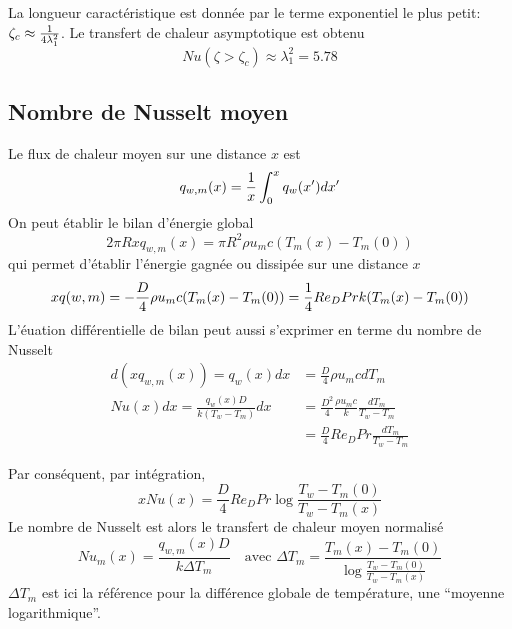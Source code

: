       La longueur caractéristique est donnée par le terme exponentiel le plus petit: $\zeta_c \approx \frac{1}{4 \lambda_1^2}$. Le transfert de chaleur asymptotique est obtenu
      \begin{equation}
        Nu(\zeta > \zeta_c) \approx \lambda_1^2 = 5.78
      \end{equation}

    \subsection{Nombre de Nusselt moyen}
      Le flux de chaleur moyen sur une distance $x$ est
      \begin{equation}
        q_{w,m} (x) = \frac{1}{x} \int_0^x q_w(x') dx'
      \end{equation}
      On peut établir le bilan d'énergie global
      \begin{equation}
        2\pi R x q_{w, m}(x) = \pi R^2 \rho u_m c (T_m(x) - T_m(0))
      \end{equation}
      qui permet d'établir l'énergie gagnée ou dissipée sur une distance $x$
      \begin{equation}
          x q(w, m) = - \frac{D}{4} \rho u_m c (T_m(x) - T_m(0)) = \frac{1}{4}Re_D Pr k (T_m(x) - T_m(0))
      \end{equation}
      L'éuation différentielle de bilan peut aussi s'exprimer en terme du nombre de Nusselt
      \begin{equation}
        \begin{aligned}
          d(x q_{w,m}(x)) = q_w(x) dx &= \frac{D}{4} \rho u_m c dT_m\\
          Nu(x)dx = \frac{q_w(x) D}{k (T_w - T_m)} dx &= \frac{D^2}{4} \frac{\rho u_m c}{k} \frac{dT_m}{T_w - T_m}\\
          &= \frac{D}{4} Re_D Pr \frac{dT_m}{T_w - T_m}
        \end{aligned}
      \end{equation}

      Par conséquent, par intégration,
      \begin{equation}
        x Nu(x) = \frac{D}{4} Re_D Pr \log\frac{T_w - T_m(0)}{T_w - T_m(x)}
      \end{equation}
      Le nombre de Nusselt est alors le transfert de chaleur moyen normalisé
      \begin{equation}
        Nu_m(x) = \frac{q_{w,m}(x) D}{k \Delta T_m} \quad \textrm{avec } \Delta T_m = \frac{T_m(x) - T_m(0)}{\log \frac{T_w - T_m(0)}{T_w - T_m(x)}}
      \end{equation}
      $\Delta T_m$ est ici la référence pour la différence globale de température, une ``moyenne logarithmique''.
